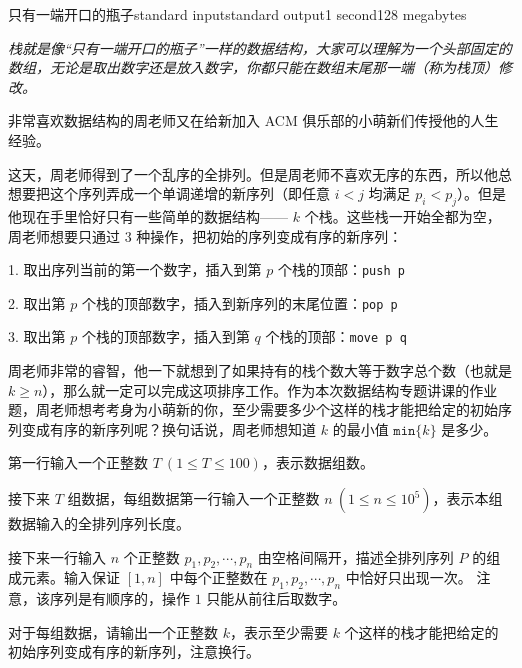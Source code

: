 \begin{problem}{只有一端开口的瓶子}{standard input}{standard output}{1 second}{128 megabytes}

    \textit{栈就是像“只有一端开口的瓶子”一样的数据结构，大家可以理解为一个头部固定的数组，无论是取出数字还是放入数字，你都只能在数组末尾那一端（称为栈顶）修改。}

    非常喜欢数据结构的周老师又在给新加入 ACM 俱乐部的小萌新们传授他的人生经验。

    这天，周老师得到了一个乱序的全排列。但是周老师不喜欢无序的东西，所以他总想要把这个序列弄成一个单调递增的新序列（即任意 $i<j$ 均满足 $p_i< p_j$）。但是他现在手里恰好只有一些简单的数据结构—— $k$ 个栈。这些栈一开始全都为空，周老师想要只通过 $3$ 种操作，把初始的序列变成有序的新序列：

    1. 取出序列当前的第一个数字，插入到第 $p$ 个栈的顶部：\texttt{push p}

    2. 取出第 $p$ 个栈的顶部数字，插入到新序列的末尾位置：\texttt{pop p}
    
    3. 取出第 $p$ 个栈的顶部数字，插入到第 $q$ 个栈的顶部：\texttt{move p q}

    周老师非常的睿智，他一下就想到了如果持有的栈个数大等于数字总个数（也就是 $k\ge n$），那么就一定可以完成这项排序工作。作为本次数据结构专题讲课的作业题，周老师想考考身为小萌新的你，至少需要多少个这样的栈才能把给定的初始序列变成有序的新序列呢？换句话说，周老师想知道 $k$ 的最小值 $\texttt{min}\{k\}$ 是多少。

    \InputFile
    
    第一行输入一个正整数 $T\ (1\le T\le 100)$，表示数据组数。
    
    接下来 $T$ 组数据，每组数据第一行输入一个正整数 $n\ (1\le n\le 10^5)$，表示本组数据输入的全排列序列长度。
     
    接下来一行输入 $n$ 个正整数 $p_1,p_2,\cdots,p_n$ 由空格间隔开，描述全排列序列 $P$ 的组成元素。输入保证 $[1,n]$ 中每个正整数在 $p_1,p_2,\cdots,p_n$ 中恰好只出现一次。 注意，该序列是有顺序的，操作 $1$ 只能从前往后取数字。

    \OutputFile
    
    对于每组数据，请输出一个正整数 $k$，表示至少需要 $k$ 个这样的栈才能把给定的初始序列变成有序的新序列，注意换行。

    
    \Example
    
    \begin{example}
    \end{example}


\end{problem}
